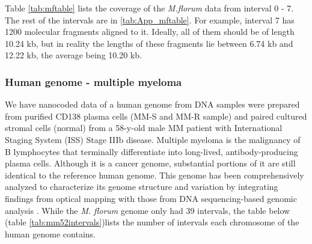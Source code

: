 Table \ref{tab:mftable} lists the coverage of the {\emph{M.florum}} data from interval 0 - 7. The rest of the intervals are in \ref{tab:App_mftable}. For example, interval 7 has 1200 molecular fragments aligned to it. Ideally, all of them should be of length 10.24 kb, but in reality the lengths of these fragments lie between 6.74 kb and 12.22 kb, the average being 10.20 kb. 

\subsubsection*{Human genome - multiple myeloma}
We have nanocoded data of a human genome from DNA samples were prepared from purified CD138 plasma cells (MM-S and MM-R sample) and paired cultured stromal cells (normal) from a 58-y-old male MM patient with International Staging System (ISS) Stage IIIb disease. Multiple myeloma is the malignancy of B lymphocytes that terminally differentiate into long-lived, antibody-producing plasma cells. Although it is a cancer genome, substantial portions of it are still identical to the reference human genome. This genome has been comprehensively analyzed to characterize its genome structure and variation by integrating findings from optical mapping with those from DNA sequencing-based genomic analysis \cite{Gupta_etal_2015_PNAS}. While the {\emph{M. florum}} genome only had 39 intervals, the table below (table \ref{tab:mm52intervals})lists the number of intervals each chromosome of the human genome contains.

